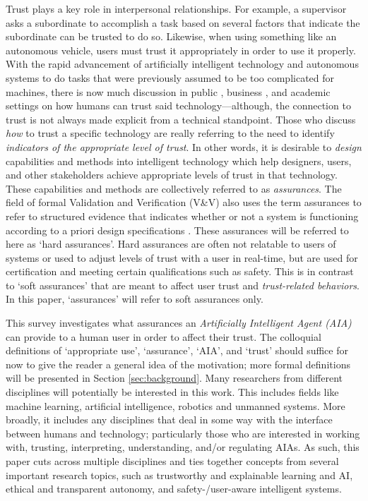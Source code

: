 Trust plays a key role in interpersonal relationships. For example, a supervisor asks a subordinate to accomplish a task based on several factors that indicate the subordinate can be trusted to do so. Likewise, when using something like an autonomous vehicle, users must trust it appropriately in order to use it properly. With the rapid advancement of artificially intelligent technology and autonomous systems to do tasks that were previously assumed to be too complicated for machines, there is now much discussion in public \cite{Spectrum2016-jv,DeSteno2014-cq,Wagner2016-ck}, business \cite{Banavar2016-nm, Khosravi2016-ke,Tankard2016-rk}, and academic settings \cite{Foley2017-qj,Castelvecchi2016-mr,Lahijanian2016-nd} on how humans can trust said technology---although, the connection to trust is not always made explicit from a technical standpoint. Those who discuss \emph{how} to trust a specific technology are really referring to the need to identify \emph{indicators of the appropriate level of trust}. 
In other words, it is desirable to \emph{design} capabilities and methods into intelligent technology which help designers, users, and other stakeholders achieve appropriate levels of trust in that technology. These capabilities and methods are collectively referred to as \textit{assurances}. The field of formal Validation and Verification (V\&V) also uses the term assurances to refer to structured evidence that indicates whether or not a system is functioning according to a priori design specifications \cite{Calinescu2017-fh}. These assurances will be referred to here as `hard assurances'. Hard assurances are often not relatable to users of systems or used to adjust levels of trust with a user in real-time, but are used for certification and meeting certain qualifications such as safety. This is in contrast to `soft assurances' that are meant to affect user trust and \emph{trust-related behaviors}. In this paper, `assurances' will refer to soft assurances only.
    
This survey investigates what assurances an \emph{Artificially Intelligent Agent (AIA)} can provide to a human user in order to affect their trust. The colloquial definitions of `appropriate use', `assurance', `AIA', and `trust' should suffice for now to give the reader a general idea of the motivation; more formal definitions will be presented in Section \ref{sec:background}. 
Many researchers from different disciplines will potentially be interested in this work. This includes fields like machine learning, artificial intelligence, robotics and unmanned systems. More broadly, it includes any disciplines that deal in some way with the interface between humans and technology; particularly those who are interested in working with, trusting, interpreting, understanding, and/or regulating AIAs. As such, this paper cuts across multiple disciplines and ties together concepts from several important research topics, such as trustworthy and explainable learning and AI, ethical and transparent autonomy, and safety-/user-aware intelligent systems.

